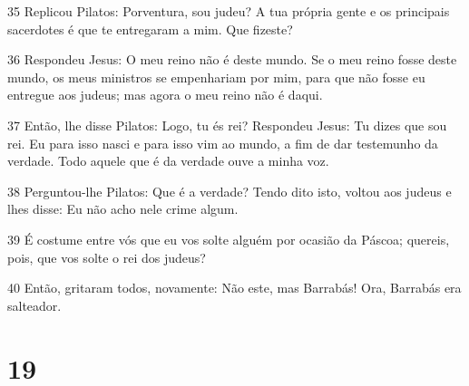 \par 35 Replicou Pilatos: Porventura, sou judeu? A tua própria gente e os principais sacerdotes é que te entregaram a mim. Que fizeste?
\par 36 Respondeu Jesus: O meu reino não é deste mundo. Se o meu reino fosse deste mundo, os meus ministros se empenhariam por mim, para que não fosse eu entregue aos judeus; mas agora o meu reino não é daqui.
\par 37 Então, lhe disse Pilatos: Logo, tu és rei? Respondeu Jesus: Tu dizes que sou rei. Eu para isso nasci e para isso vim ao mundo, a fim de dar testemunho da verdade. Todo aquele que é da verdade ouve a minha voz.
\par 38 Perguntou-lhe Pilatos: Que é a verdade? Tendo dito isto, voltou aos judeus e lhes disse: Eu não acho nele crime algum.
\par 39 É costume entre vós que eu vos solte alguém por ocasião da Páscoa; quereis, pois, que vos solte o rei dos judeus?
\par 40 Então, gritaram todos, novamente: Não este, mas Barrabás! Ora, Barrabás era salteador.

\chapter{19}

